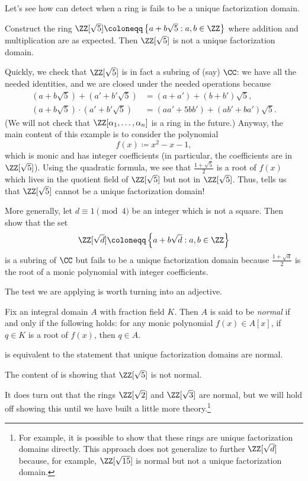 \documentclass[../notes.tex]{subfiles}
\begin{document}
Let's see how  can detect when a ring is fails to be a unique factorization domain.
\begin{example} \label{ex:z-root-5-not-normal}
	Construct the ring $\ZZ[\sqrt 5]\coloneqq\left\{a+b\sqrt 5:a,b\in\ZZ\right\}$ where addition and multiplication are as expected. Then $\ZZ[\sqrt 5]$ is not a unique factorization domain.
\end{example}
\begin{solution}
	Quickly, we check that $\ZZ[\sqrt 5]$ is in fact a subring of (say) $\CC$: we have all the needed identities, and we are closed under the needed operations because
	\begin{align*}
		\left(a+b\sqrt 5\right)+\left(a'+b'\sqrt 5\right) &= (a+a')+(b+b')\sqrt 5, \\
		\left(a+b\sqrt 5\right)\cdot\left(a'+b'\sqrt 5\right) &= (aa'+5bb')+(ab'+ba')\sqrt 5.
	\end{align*}
	(We will not check that $\ZZ[\alpha_1,\ldots,\alpha_n]$ is a ring in the future.) Anyway, the main content of this example is to consider the polynomial
	\[f(x)\coloneqq x^2-x-1,\]
	which is monic and has integer coefficients (in particular, the coefficients are in $\ZZ[\sqrt 5]$). Using the quadratic formula, we see that $\frac{1+\sqrt5}2$ is a root of $f(x)$ which lives in the quotient field of $\ZZ[\sqrt 5]$ but not in $\ZZ[\sqrt 5]$. Thus,  tells us that $\ZZ[\sqrt 5]$ cannot be a unique factorization domain!
\end{solution}
\begin{exe}
	More generally, let $d\equiv1\pmod4$ be an integer which is not a square. Then show that the set
	\[\ZZ[\sqrt d]\coloneqq\left\{a+b\sqrt d:a,b\in\ZZ\right\}\]
	is a subring of $\CC$ but fails to be a unique factorization domain because $\frac{1+\sqrt d}2$ is the root of a monic polynomial with integer coefficients.
\end{exe}
The test we are applying is worth turning into an adjective.
\begin{definition}[normal]
	Fix an integral domain $A$ with fraction field $K$. Then $A$ is said to be \textit{normal} if and only if the following holds: for any monic polynomial $f(x)\in A[x]$, if $q\in K$ is a root of $f(x)$, then $q\in A$.
\end{definition}
\begin{example}
	 is equivalent to the statement that unique factorization domains are normal.
\end{example}
\begin{nex}
	The content of  is showing that $\ZZ[\sqrt5]$ is not normal.
\end{nex}
It does turn out that the rings $\ZZ[\sqrt2]$ and $\ZZ[\sqrt3]$ are normal, but we will hold off showing this until we have built a little more theory.\footnote{For example, it is possible to show that these rings are unique factorization domains directly. This approach does not generalize to further $\ZZ[\sqrt d]$ because, for example, $\ZZ[\sqrt{15}]$ is normal but not a unique factorization domain.}
\end{document}
